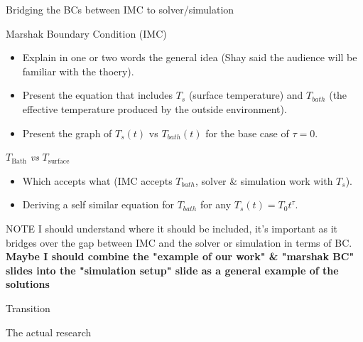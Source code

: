 \documentclass[presentation,10pt]{beamer}
\begin{document}
\begin{frame}{Bridging the BCs between IMC to solver/simulation}
  \begin{block}{Marshak Boundary Condition (IMC)}
    \begin{itemize}
      \item Explain in one or two words the general idea (Shay said the audience will be familiar with the thoery).
      \item Present the equation that includes $T_s$ (surface temperature) and $T_{bath}$ (the effective temperature produced by the outside environment).
      \item Present the graph of $T_s(t)$ vs $T_{bath}(t)$ for the base case of $\tau = 0$.
    \end{itemize}
  \end{block}
  \begin{block}{$T_\text{Bath}$ \textit{vs} $T_\text{surface}$}
    \begin{itemize}
      \item Which accepts what (IMC accepts $T_{bath}$, solver \& simulation work with $T_s$).
      \item Deriving a self similar equation for $T_{bath}$ for any $T_s(t)=T_0 t^\tau$.
    \end{itemize} 
  \end{block}
  \begin{alertblock}{NOTE}
    I should understand where it should be included, it's important as it bridges over the gap between IMC and the solver or simulation in terms of BC. \textbf{Maybe I should combine the "example of our work" \& "marshak BC" slides into the "simulation setup" slide as a general example of the solutions}
  \end{alertblock}
\end{frame}

\begin{frame}{Transition}
  \begin{block}{The actual research}
  \end{block}
\end{frame}
\end{document}
